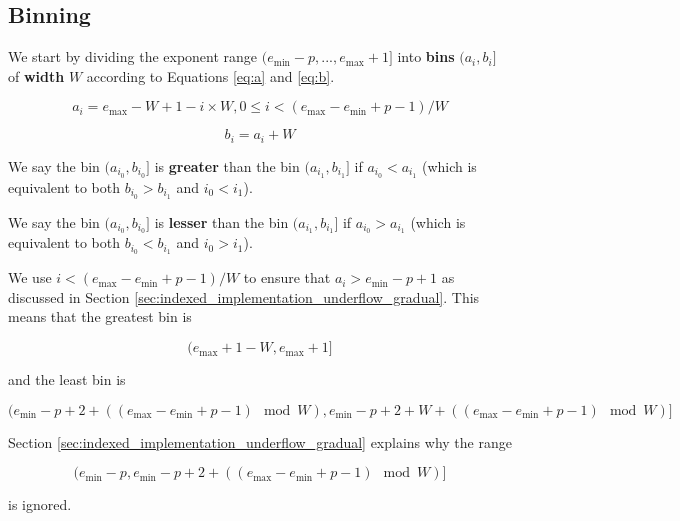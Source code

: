 \documentclass[12pt]{article}
\providecommand{\min}{\ensuremath{\text{min}}}
\providecommand{\max}{\ensuremath{\text{max}}}
\theoremstyle{plain}
\numberwithin{equation}{section}
\begin{document}
  \subsection{Binning}
    \label{sec:indexed_binning}
    We start by dividing the exponent range $(e_{\min} - p, ..., e_{\max} + 1]$ into \textbf{bins} $(a_i, b_i]$ of \textbf{width} $W$ according to Equations \ref{eq:a} and \ref{eq:b}.

    \begin{equation}
      a_i = e_{\max} - W + 1 - i\times W, 0 \leq i < (e_{\max} - e_{\min} + p - 1)/W
      \label{eq:a}
    \end{equation}

    \begin{equation}
      b_i = a_i + W
      \label{eq:b}
    \end{equation}

    We say the bin $(a_{i_0}, b_{i_0}]$ is \textbf{greater} than the bin $(a_{i_1}, b_{i_1}]$ if $a_{i_0} < a_{i_1}$ (which is equivalent to both $b_{i_0} > b_{i_1}$ and $i_0 < i_1$).

    We say the bin $(a_{i_0}, b_{i_0}]$ is \textbf{lesser} than the bin $(a_{i_1}, b_{i_1}]$ if $a_{i_0} > a_{i_1}$ (which is equivalent to both $b_{i_0} < b_{i_1}$ and $i_0 > i_1$).

    We use $i < (e_{\max} - e_{\min} + p - 1)/W$ to ensure that $a_i > e_{\min} - p + 1$ as discussed in Section \ref{sec:indexed_implementation_underflow_gradual}. This means that the greatest bin is

    \begin{equation}
      (e_{\max} + 1 - W, e_{\max} + 1]
      \label{eq:binmax}
    \end{equation}

    and the least bin is

    \begin{equation}
      (e_{\min} - p + 2 + ((e_{\max} - e_{\min} + p - 1)\mod W),
      e_{\min} - p + 2 + W + ((e_{\max} - e_{\min} + p - 1)\mod W)]
      \label{eq:binmin}
    \end{equation}

    Section \ref{sec:indexed_implementation_underflow_gradual} explains why the range

    \begin{equation*}
    (e_{\min} - p, e_{\min} - p + 2 + ((e_{\max} - e_{\min} + p - 1) \mod W)]
    \end{equation*}

    is ignored.
\end{document}
